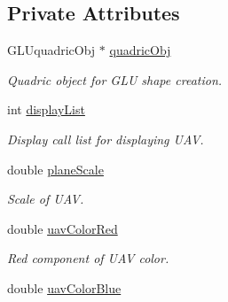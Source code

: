 \subsection*{Private Attributes}
\begin{DoxyCompactItemize}
\item 
\hypertarget{class_shadow_uav_display_a5254b81f53ad907acf105f63ea4fba55}{
GLUquadricObj $\ast$ \hyperlink{class_shadow_uav_display_a5254b81f53ad907acf105f63ea4fba55}{quadricObj}}
\label{class_shadow_uav_display_a5254b81f53ad907acf105f63ea4fba55}

\begin{DoxyCompactList}\small\item\em Quadric object for GLU shape creation. \end{DoxyCompactList}\item 
\hypertarget{class_shadow_uav_display_a774c5fac9b8a599f2d9479e466ff8a87}{
int \hyperlink{class_shadow_uav_display_a774c5fac9b8a599f2d9479e466ff8a87}{displayList}}
\label{class_shadow_uav_display_a774c5fac9b8a599f2d9479e466ff8a87}

\begin{DoxyCompactList}\small\item\em Display call list for displaying UAV. \end{DoxyCompactList}\item 
\hypertarget{class_shadow_uav_display_adae8b9044ee0f83508889f7939164e56}{
double \hyperlink{class_shadow_uav_display_adae8b9044ee0f83508889f7939164e56}{planeScale}}
\label{class_shadow_uav_display_adae8b9044ee0f83508889f7939164e56}

\begin{DoxyCompactList}\small\item\em Scale of UAV. \end{DoxyCompactList}\item 
\hypertarget{class_shadow_uav_display_aca47da335117e77b98be154d27c364c3}{
double \hyperlink{class_shadow_uav_display_aca47da335117e77b98be154d27c364c3}{uavColorRed}}
\label{class_shadow_uav_display_aca47da335117e77b98be154d27c364c3}

\begin{DoxyCompactList}\small\item\em Red component of UAV color. \end{DoxyCompactList}\item 
\hypertarget{class_shadow_uav_display_a87eb3b200d54e0150b98cabb1cf5febd}{
double \hyperlink{class_shadow_uav_display_a87eb3b200d54e0150b98cabb1cf5febd}{uavColorBlue}}
\label{class_shadow_uav_display_a87eb3b200d54e0150b98cabb1cf5febd}


\end{DoxyCompactItemize}
